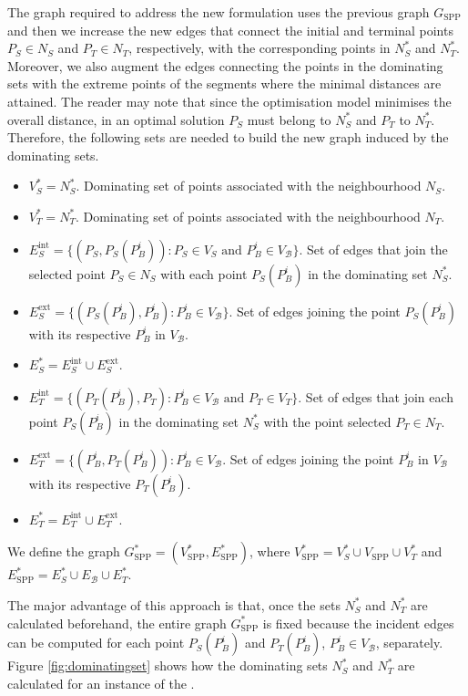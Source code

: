 \documentclass[a4paper,  review, authoryear, 1p., doubleblind]{elsarticle}
\newcommand{\SPPN}{{\sf{H-SPPN}\xspace }}
\newcommand{\VB}{{V^{}_{\mathcal B}}}
\newcommand{\EB}{{E^{}_{\mathcal B}}}
\newcommand{\VS}{{V^{}_{S}}}
\newcommand{\VT}{{V^{}_{T}}}
\newcommand{\GSPP}{{G_{\text{SPP}}}}
\newcommand{\VSPP}{{V_{\text{SPP}}}}
\newcommand{\GSPPS}{{G^{*}_{\text{SPP}}}}
\newcommand{\VSPPS}{{V^{*}_{\text{SPP}}}}
\newcommand{\ESPPS}{{E^{*}_{\text{SPP}}}}
\begin{document}
	The graph required to address the new formulation uses the previous graph $\GSPP$ and then we increase the new edges that connect the initial and terminal points $P_S\in N_S$ and $P_T\in N_T$, respectively, with the corresponding points in $N_S^*$ and $N_T^*$. Moreover, we also augment the edges connecting the points in the dominating sets with the extreme points of the segments where the minimal distances are attained. The reader may note that since the optimisation model minimises the overall distance, in an optimal solution $P_S$ must belong to $N_S^*$ and $P_T$ to $N_T^*$.
	Therefore, the following sets are needed to build the new graph induced by the dominating sets.
	\begin{itemize}
		\item $V_S^*=N^*_S$. Dominating set of points associated with the neighbourhood $N_S$.
		\item $V_T^*=N^*_T$. Dominating set of points associated with the neighbourhood $N_T$.
		\item $E^\text{int}_S=\{(P_S, P_S(P_B^i)):P_S\in\VS\text{ and }P_B^i\in \VB\}$. Set of edges that join the selected point $P_S\in N_S$ with each point $P_S(P_B^i)$ in the dominating set $N^*_S$.
		\item $E^\text{ext}_S=\{(P_S(P_B^i), P_B^i):P_B^i\in\VB\}$. Set of edges joining the point $P_S(P_B^i)$ with its respective $P_B^i$ in $\VB$. 
		\item $E^*_S=E^\text{int}_S\cup E^\text{ext}_S.$
		\item $E^\text{int}_T=\{(P_T(P_B^i), P_T):P_B^i\in \VB\text{ and }P_T\in\VT\}$. Set of edges that join each point $P_S(P_B^i)$ in the dominating set $N^*_S$ with the point selected $P_T\in N_T$. 
		\item $E^\text{ext}_T=\{(P_B^i, P_T(P_B^i)):P_B^i\in\VB$. Set of edges joining the point $P_B^i$ in $\VB$ with its respective $P_T(P_B^i)$. 
		\item $E^*_T=E^\text{int}_T\cup E^\text{ext}_T.$
	\end{itemize}
	We define the graph $\GSPPS=(\VSPPS, \ESPPS)$, where $\VSPPS=V^*_S\cup\VSPP\cup V^*_T$ and $\ESPPS=E^*_S\cup\EB\cup E^*_T.$
	
	
	The major advantage of this approach is that, once the sets $N_S^*$ and $N_T^*$ are calculated beforehand, the entire graph $\GSPPS$ is fixed because the incident edges can be computed for each point $P_S(P_B^i)$ and $P_T(P_B^i)$, $P_B^i\in V_{\mathcal B}$, separately. Figure \ref{fig:dominatingset} shows how the dominating sets $N_S^*$ and $N_T^*$ are calculated for an instance of the \SPPN.
	
\end{document}
